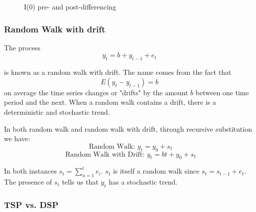 \documentclass[11pt]{article}
\begin{document}
\begin{figure}[h]
    \centering
    \qquad
    \caption{I(0) pre- and post-differencing}%
    \label{fig:differencing I(1)}%
\end{figure}

\subsubsection{Random Walk with drift}

The process 
\[y_t = b + y_{t-1} + e_t\]

is known as a random walk with drift. The name comes from the fact that
\[E(y_t - y_{t-1}) = b\]
on average the time series changes or "drifts" by the amount $b$ between one time period and the next. When a random walk contains a drift, there is a deterministic and stochastic trend.

In both random walk and random walk with drift, through recursive substitution we have:
\[\text{ Random Walk: } y_t = y_0 + s_t\]
\[\text{ Random Walk with Drift: } y_t =bt + y_0 + s_t\]

In both instances $s_t=\sum_{u=1}^t e_i$. $s_t$ is itself a random walk since $s_t = s_{t-1} + e_t$. The presence of $s_t$ tells us that $y_t$ has a stochastic trend.

\subsubsection{TSP vs. DSP}
\end{document}
